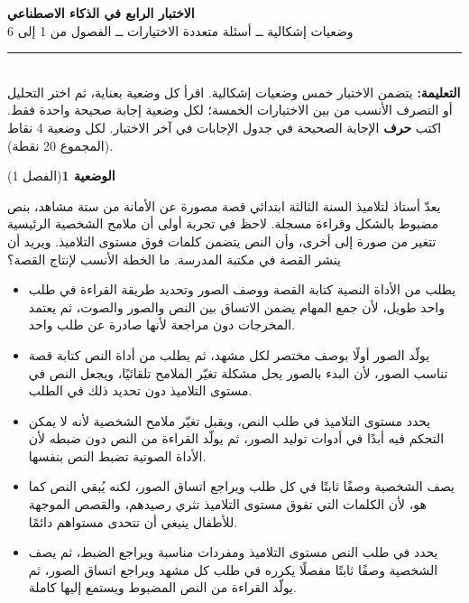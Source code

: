 \documentclass[11pt,a4paper]{article}
\begin{document}
\linespread{1.08}\selectfont
\begin{center}
{\LARGE\khatt\textbf{الاختبار الرابع في الذكاء الاصطناعي}}\\[4pt]
{\normalsize وضعيات إشكالية ــ أسئلة متعددة الاختيارات ــ الفصول من 1 إلى 6}
\end{center}
\vspace{-2pt}\rule{\textwidth}{0.6pt}\\[2pt]
\textbf{التعليمة:} يتضمن الاختبار خمس وضعيات إشكالية. اقرأ كل وضعية بعناية، ثم اختر التحليل أو التصرف الأنسب
من بين الاختيارات الخمسة؛ لكل وضعية إجابة صحيحة واحدة فقط.
اكتب \textbf{حرف} الإجابة الصحيحة في جدول الإجابات في آخر الاختبار.
لكل وضعية 4 نقاط (المجموع 20 نقطة).
\vspace{4pt}

\noindent
{\large\khatt\textbf{الوضعية 1}}\hfill{\small(الفصل 1)}\par\nopagebreak\vspace{3pt}
\setlength{\fboxsep}{7pt}\colorbox{gray!10}{\parbox{\dimexpr\linewidth-14pt}{يعدّ أستاذ لتلاميذ السنة الثالثة ابتدائي قصة مصورة عن الأمانة من ستة مشاهد، بنص مضبوط بالشكل وقراءة مسجلة. لاحظ في تجربة أولى أن ملامح الشخصية الرئيسية تتغير من صورة إلى أخرى، وأن النص يتضمن كلمات فوق مستوى التلاميذ. ويريد أن ينشر القصة في مكتبة المدرسة. ما الخطة الأنسب لإنتاج القصة؟}}\par\nopagebreak
\begin{itemize}[leftmargin=1.0cm, labelsep=6pt, itemsep=3pt, topsep=4pt, parsep=0pt]
  \item[\textbf{أ)}] يطلب من الأداة النصية كتابة القصة ووصف الصور وتحديد طريقة القراءة في طلب واحد طويل، لأن جمع المهام يضمن الاتساق بين النص والصور والصوت، ثم يعتمد المخرجات دون مراجعة لأنها صادرة عن طلب واحد.
  \item[\textbf{ب)}] يولّد الصور أولًا بوصف مختصر لكل مشهد، ثم يطلب من أداة النص كتابة قصة تناسب الصور، لأن البدء بالصور يحل مشكلة تغيّر الملامح تلقائيًا، ويجعل النص في مستوى التلاميذ دون تحديد ذلك في الطلب.
  \item[\textbf{ج)}] يحدد مستوى التلاميذ في طلب النص، ويقبل تغيّر ملامح الشخصية لأنه لا يمكن التحكم فيه أبدًا في أدوات توليد الصور، ثم يولّد القراءة من النص دون ضبطه لأن الأداة الصوتية تضبط النص بنفسها.
  \item[\textbf{د)}] يصف الشخصية وصفًا ثابتًا في كل طلب ويراجع اتساق الصور، لكنه يُبقي النص كما هو، لأن الكلمات التي تفوق مستوى التلاميذ تثري رصيدهم، والقصص الموجهة للأطفال ينبغي أن تتحدى مستواهم دائمًا.
  \item[\textbf{هـ)}] يحدد في طلب النص مستوى التلاميذ ومفردات مناسبة ويراجع الضبط، ثم يصف الشخصية وصفًا ثابتًا مفصلًا يكرره في طلب كل مشهد ويراجع اتساق الصور، ثم يولّد القراءة من النص المضبوط ويستمع إليها كاملة.
\end{itemize}
\end{document}
